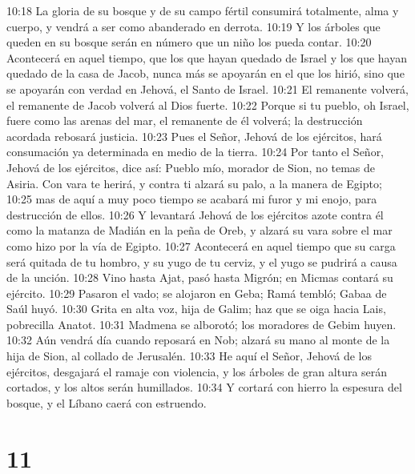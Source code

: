 10:18 La gloria de su bosque y de su campo fértil consumirá totalmente, alma y cuerpo, y vendrá a ser como abanderado en derrota.  
10:19 Y los árboles que queden en su bosque serán en número que un niño los pueda contar.  
10:20 Acontecerá en aquel tiempo, que los que hayan quedado de Israel y los que hayan quedado de la casa de Jacob, nunca más se apoyarán en el que los hirió, sino que se apoyarán con verdad en Jehová, el Santo de Israel.  
10:21 El remanente volverá, el remanente de Jacob volverá al Dios fuerte.  
10:22 Porque si tu pueblo, oh Israel, fuere como las arenas del mar, el remanente de él volverá; la destrucción acordada rebosará justicia.  
10:23 Pues el Señor, Jehová de los ejércitos, hará consumación ya determinada en medio de la tierra. 
10:24 Por tanto el Señor, Jehová de los ejércitos, dice así: Pueblo mío, morador de Sion, no temas de Asiria. Con vara te herirá, y contra ti alzará su palo, a la manera de Egipto;  
10:25 mas de aquí a muy poco tiempo se acabará mi furor y mi enojo, para destrucción de ellos.  
10:26 Y levantará Jehová de los ejércitos azote contra él como la matanza de Madián en la peña de Oreb, y alzará su vara sobre el mar como hizo por la vía de Egipto.  
10:27 Acontecerá en aquel tiempo que su carga será quitada de tu hombro, y su yugo de tu cerviz, y el yugo se pudrirá a causa de la unción.  
10:28 Vino hasta Ajat, pasó hasta Migrón; en Micmas contará su ejército.  
10:29 Pasaron el vado; se alojaron en Geba; Ramá tembló; Gabaa de Saúl huyó.  
10:30 Grita en alta voz, hija de Galim; haz que se oiga hacia Lais, pobrecilla Anatot.  
10:31 Madmena se alborotó; los moradores de Gebim huyen.  
10:32 Aún vendrá día cuando reposará en Nob; alzará su mano al monte de la hija de Sion, al collado de Jerusalén.  
10:33 He aquí el Señor, Jehová de los ejércitos, desgajará el ramaje con violencia, y los árboles de gran altura serán cortados, y los altos serán humillados.  
10:34 Y cortará con hierro la espesura del bosque, y el Líbano caerá con estruendo.  

\chapter{11}

